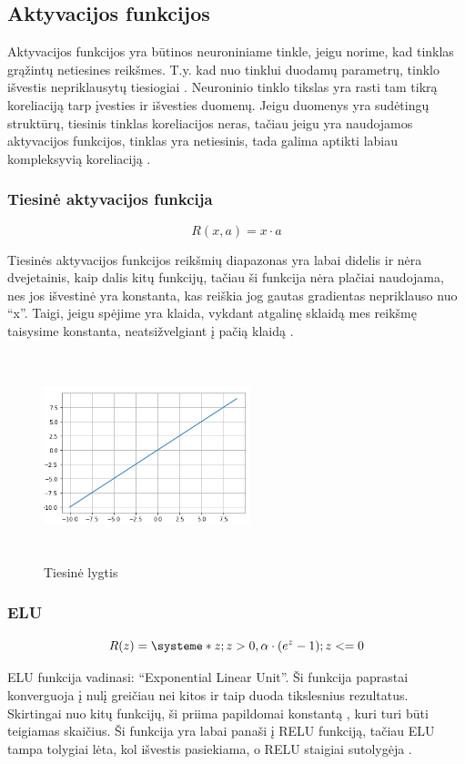 \documentclass{VUMIFInfKursinis}
\begin{document}
\subsection{Aktyvacijos funkcijos}
\par
Aktyvacijos funkcijos yra būtinos neuroniniame tinkle, jeigu norime, kad tinklas
grąžintų netiesines reikšmes. T.y. kad nuo tinklui duodamų parametrų, tinklo išvestis
nepriklausytų tiesiogiai \cite{salt18}. Neuroninio tinklo tikslas yra rasti tam tikrą
koreliaciją tarp įvesties ir išvesties duomenų. Jeigu duomenys yra sudėtingų struktūrų,
tiesinis tinklas koreliacijos neras, tačiau jeigu yra naudojamos aktyvacijos funkcijos,
tinklas yra netiesinis, tada galima aptikti labiau kompleksyvią koreliaciją \cite{salt18}.

\subsubsection{Tiesinė aktyvacijos funkcija}
\begin{equation}\label{eqn:lygtis}
R(x, a) = x \cdot a
\end{equation}
\par
Tiesinės aktyvacijos funkcijos reikšmių diapazonas yra labai didelis ir nėra dvejetainis,
kaip dalis kitų funkcijų, tačiau ši funkcija nėra plačiai naudojama, nes jos
išvestinė yra konstanta, kas reiškia jog gautas gradientas nepriklauso nuo \enquote{x}.
Taigi, jeigu spėjime yra klaida, vykdant atgalinę sklaidą mes reikšmę taisysime
konstanta, neatsižvelgiant į pačią klaidą \cite{salt16}.

\begin{figure}[ht]
  \centering
  \includegraphics[width=6cm,height=6cm,keepaspectratio]{tiesine.png}
  \caption{Tiesinė lygtis}
  \label{fig:lygtis1}
\end{figure}

\subsubsection{ELU}
\begin{equation}
  R(z) = \systeme*{z; z > 0, \alpha \cdot (e^z - 1); z <= 0}
\end{equation}
\par
ELU funkcija vadinasi: \enquote{Exponential Linear Unit}. Ši funkcija paprastai konverguoja į
nulį greičiau nei kitos ir taip duoda tikslesnius rezultatus. Skirtingai nuo kitų
funkcijų, ši priima papildomai konstantą , kuri turi būti teigiamas skaičius.
Ši funkcija yra labai panaši į RELU funkciją, tačiau ELU tampa tolygiai lėta,
kol išvestis pasiekiama, o RELU staigiai sutolygėja \cite{salt16}.
\end{document}
